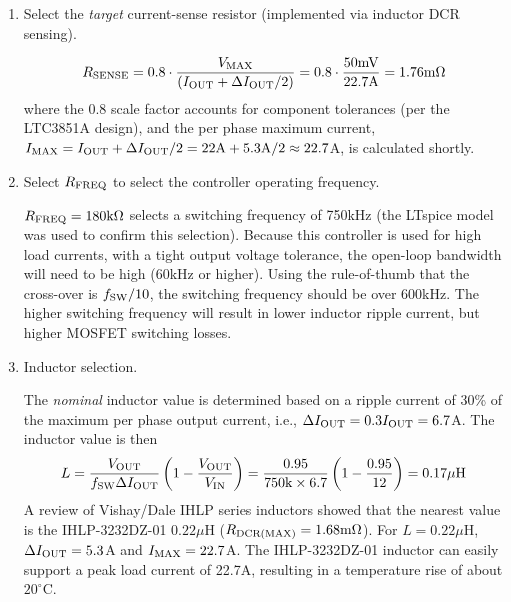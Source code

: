 \begin{enumerate}
\item Select the {\em target} current-sense resistor (implemented
via inductor DCR sensing).

\begin{equation}
R_{\rm SENSE} = 0.8\cdot\frac{V_{\rm MAX}}{(I_{\rm OUT} + \Delta I_{\rm OUT}/2)} =
0.8\cdot\frac{50\text{mV}}{22.7\text{A}} = 1.76\text{m}\Omega 
\end{equation}
%
where the 0.8 scale factor accounts for component tolerances (per the LTC3851A design),
and the per phase maximum current, $I_{\rm MAX} = I_{\rm OUT} + \Delta I_{\rm OUT}/2 = 22\text{A} + 5.3\text{A}/2 \approx 22.7$A, is calculated shortly.
%
\item Select $R_{\rm FREQ}$ to select the controller operating
frequency.

$R_{\rm FREQ} = 180\text{k}\Omega$ selects a switching frequency of
750kHz (the LTspice model was used to confirm this selection).
Because this controller is used for high load currents, with a 
tight output voltage tolerance, the open-loop bandwidth will need
to be high (60kHz or higher). Using the rule-of-thumb that the cross-over
is $f_{\rm SW}/10$, the switching frequency should be over 600kHz.
The higher switching frequency will result
in lower inductor ripple current, but higher MOSFET switching losses.

\item Inductor selection.

The {\em nominal} inductor value is determined based on a ripple current of
30\% of the maximum per phase output current, i.e., 
$\Delta I_{\rm OUT} = 0.3I_{\rm OUT} = 6.7$A. The inductor value 
is then
%
\begin{equation}
L = \frac{V_{\rm OUT}}{f_{\rm SW}\Delta I_{\rm OUT}}\left(
1 - \frac{V_{\rm OUT}}{V_{\rm IN}}\right) =
\frac{0.95}{750\text{k}\times6.7}\left(
1 - \frac{0.95}{12}\right) = 0.17\mu\text{H}
\end{equation}
%
A review of Vishay/Dale IHLP series inductors showed that the nearest
value is the IHLP-3232DZ-01 $0.22\mu\text{H}$ 
($R_{\rm DCR(MAX)} = 1.68\text{m}\Omega$).
For $L = 0.22\mu$H, $\Delta I_{\rm OUT} = 5.3$A and 
$I_{\rm MAX} = 22.7$A. The IHLP-3232DZ-01 inductor can easily
support a peak load current of 22.7A, resulting in a temperature 
rise of about $20^\circ$C.


\end{enumerate}

